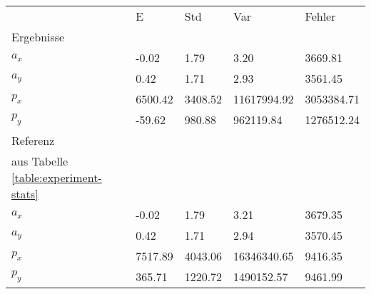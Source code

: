 \begin{tabular}{l|l|l|l|l}

     & E   & Std    & Var    & Fehler \\
\hhline{=|=|=|=|=}

Ergebnisse & & & & \\
$a_x$  &        -0.02 &         1.79 &         3.20 &      3669.81 \\
$a_y$  &         0.42 &         1.71 &         2.93 &      3561.45 \\
$p_x$  &      6500.42 &      3408.52 &  11617994.92 &   3053384.71 \\
$p_y$  &       -59.62 &       980.88 &    962119.84 &   1276512.24 \\

\hline
Referenz & & & & \\
aus Tabelle  \ref{table:experiment-stats} & & & & \\
$a_x$  &        -0.02 &         1.79 &         3.21 &      3679.35 \\
$a_y$  &         0.42 &         1.71 &         2.94 &      3570.45 \\
$p_x$  &      7517.89 &      4043.06 &  16346340.65 &      9416.35 \\
$p_y$  &       365.71 &      1220.72 &   1490152.57 &      9461.99 \\
\end{tabular}
